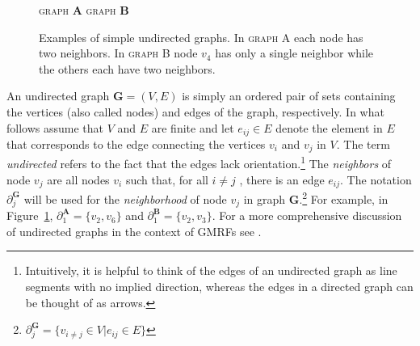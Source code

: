  \begin{figure}[htb]
\centering

\textsc{graph $\mathbf{A}$} \hspace{6cm} \textsc{graph $\mathbf{B}$} 

\vspace{.5cm}

%
 \hspace{4cm} 
\vspace{.5cm}
\caption{Examples of simple undirected graphs. In \textsc{graph A} each node has two neighbors. In \textsc{graph B} node $v_4$ has only a single neighbor while the others each have two neighbors.}
\label{fig:undirected_graphs}
\end{figure}

 An undirected graph $\mathbf{G} = (V,E)$ is simply an ordered pair of sets containing the vertices (also called nodes) and edges of the graph, respectively. In what follows assume that $V$ and $E$ are finite and let $e_{ij} \in E$ denote the element in $E$ that corresponds to the edge connecting the vertices $v_i$ and $v_j$ in $V$. The term {\it undirected} refers to the fact that the edges lack orientation.\footnote{Intuitively, it is helpful to think of the edges of an undirected graph as line segments with no implied direction, whereas the edges in a directed graph can be thought of as arrows.} The {\it neighbors} of node $v_j$ are all nodes $v_i$ such that, for all $i \neq j$ , there is an edge $e_{ij}$. The notation $\partial^{\mathbf{G}}_j$ will be used for the {\it neighborhood} of node $v_j$ in graph  $\mathbf{G}$.\footnote{$ \partial^\mathbf{G}_j = \{v_{i \neq j} \in V | e_{ij} \in E\}$} For example, in Figure~\ref{fig:undirected_graphs}, $\partial^{\mathbf{A}}_1 = \{v_2, v_6\}$ and $\partial^{\mathbf{B}}_1 = \{v_2, v_3\}$.  For a more comprehensive discussion of undirected graphs in the context of GMRFs see . 
 

